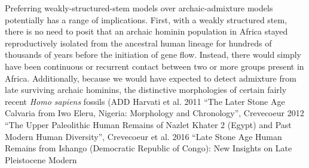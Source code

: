 \documentclass[]{article}
\begin{document}
Preferring weakly-structured-stem models over archaic-admixture models potentially has 
a range of implications. First, with a weakly structured stem, there is no need to posit 
that an archaic hominin population in Africa stayed reproductively isolated from the 
ancestral human lineage for hundreds of thousands of years before the initiation of 
gene flow. Instead, there would simply have been continuous or recurrent contact between 
two or more groups present in Africa. Additionally, because we would have expected to 
detect admixture from late surviving archaic hominins, the distinctive morphologies of 
certain fairly recent \emph{Homo sapiens} fossils (ADD Harvati et al. 2011 
``The Later Stone Age Calvaria from Iwo Eleru, Nigeria: Morphology and Chronology'', 
Crevecoeur 2012 ``The Upper Paleolithic Human Remains of Nazlet Khater 2 (Egypt) and 
Past Modern Human Diversity'', Crevecoeur et al. 2016 ``Late Stone Age Human Remains 
from Ishango (Democratic Republic of Congo): New Insights on Late Pleistocene Modern 
\end{document}
